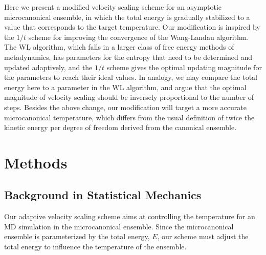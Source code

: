 \documentclass[reprint]{revtex4-1}
\begin{document}
Here we present a modified velocity scaling scheme
for an asymptotic microcanonical ensemble,
in which
the total energy is gradually stabilized to a value
that corresponds to the target temperature.
%
Our modification is inspired by the $1/t$ scheme\cite{
  belardinelli2007, belardinelli2007jcp, belardinelli2008,
  zhou2005, zhou2008, morozov2007}
for improving the convergence of the Wang-Landau algorithm\cite{
  wang2001, wang2001pre}.
The WL algorithm,
which falls in a larger class of free energy methods
of metadynamics\cite{
  laio2002, laio2008, marsili2006},
has parameters for the entropy that need to be
determined and updated adaptively,
and the $1/t$ scheme gives the optimal updating magnitude
for the parameters to reach their ideal values.
%
In analogy, we may compare the total energy here
to a parameter in the WL algorithm,
and argue that the optimal magnitude
of velocity scaling should be inversely proportional
to the number of steps.
%
Besides the above change,
our modification will target a more accurate
microcanonical temperature\cite{rugh1997},
which differs from the usual definition of
twice the kinetic energy per degree of freedom
derived from the canonical ensemble.



\section{Methods}



\subsection{Background in Statistical Mechanics}



Our adaptive velocity scaling scheme aims at
controlling the temperature for an
MD simulation in the microcanonical ensemble.
%
Since the microcanonical ensemble is parameterized by
the total energy, $E$,
our scheme must adjust the total energy
to influence the temperature of the ensemble.
\end{document}
